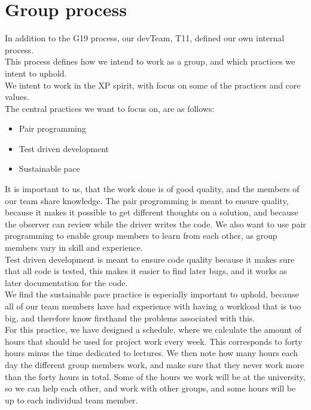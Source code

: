 \section{Group process}

In addition to the \gls{G19} process, our \gls{devTeam}, \gls{T11}, defined our own internal process.\\
This process defines how we intend to work as a group, and which practices we intent to uphold. \\

We intent to work in the \gls{XP} spirit, with focus on some of the practices and core values.\\
The central practices we want to focus on, are as follows:
\begin{itemize}
    \item Pair programming 
    \item Test driven development
    \item Sustainable pace
\end{itemize}

It is important to us, that the work done is of good quality, and the members of our team share knowledge. The pair programming is meant to ensure quality, because it makes it possible to get different thoughts on a solution, and because the observer can review while the \gls{driver} writes the code. We also want to use pair programming to enable group members to learn from each other, as group members vary in skill and experience.\\
Test driven development is meant to ensure code quality because it makes sure that all code is tested, this makes it easier to find later bugs, and it works as later documentation for the code.\\
We find the sustainable pace practice is especially important to uphold, because all of our team members have had experience with having a workload that is too big, and therefore know firsthand the problems associated with this.\\
For this practice, we have designed a schedule, where we calculate the amount of hours that should be used for project work every week. This corresponds to forty hours minus the time dedicated to lectures. We then note how many hours each day the different group members work, and make sure that they never work more than the forty hours in total. Some of the hours we work will be at the university, so we can help each other, and work with other groups, and some hours will be up to each individual team member.\\

